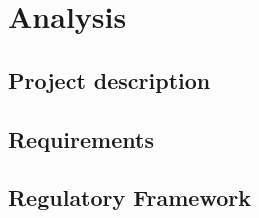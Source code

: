 \chapter{Analysis}\label{chap:analysis}



\section{Project description}  %



\section{Requirements}



\section{Regulatory Framework}


